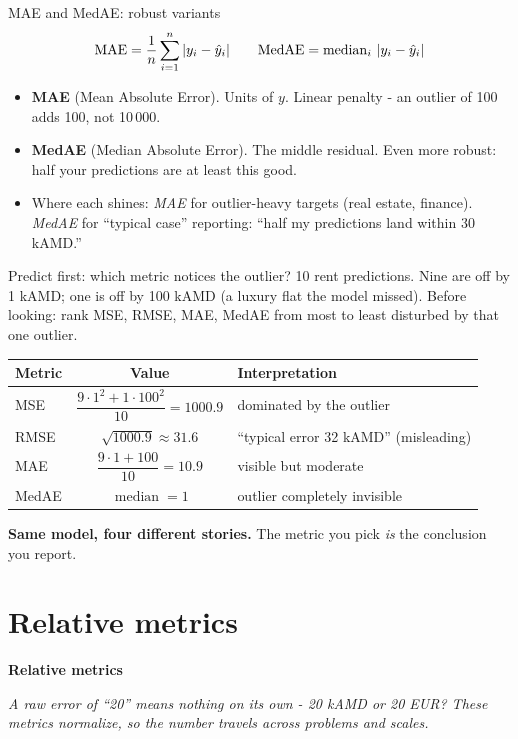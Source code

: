 \documentclass[aspectratio=169]{beamer}
\newcommand{\sectiontransition}[2]{%
  \begin{frame}[plain]
    \centering
    \vfill
    {\color{armblue}\Large\textbf{#1}}\\[14pt]
    \begin{minipage}{0.78\textwidth}\centering\itshape #2\end{minipage}
    \vfill
  \end{frame}%
}
\begin{document}
\begin{frame}{MAE and MedAE: robust variants}
  \[
    \text{MAE} = \frac{1}{n} \sum_{i=1}^n |y_i - \hat{y}_i|
    \qquad
    \text{MedAE} = \operatorname{median}_i\, |y_i - \hat{y}_i|
  \]
  \vfill
  \begin{itemize}
    \item \textbf{MAE} (Mean Absolute Error). Units of $y$. Linear penalty - an outlier of 100 adds 100, not 10\,000.
    \item \textbf{MedAE} (Median Absolute Error). The middle residual. Even more robust: half your predictions are at least this good.
    \item Where each shines: \emph{MAE} for outlier-heavy targets (real estate, finance). \emph{MedAE} for ``typical case'' reporting: ``half my predictions land within 30 kAMD.''
  \end{itemize}
\end{frame}

\begin{frame}{Predict first: which metric notices the outlier?}
  10 rent predictions. Nine are off by 1 kAMD; one is off by 100 kAMD (a luxury flat the model missed).
  \vfill
  Before looking: rank MSE, RMSE, MAE, MedAE from most to least disturbed by that one outlier.
  \pause
  \vfill
  \begin{center}\small
    \begin{tabular}{lcl}
      Metric & Value & Interpretation \\ \hline
      MSE   & $\dfrac{9 \cdot 1^2 + 1 \cdot 100^2}{10} = 1000.9$ & dominated by the outlier \\[4pt]
      RMSE  & $\sqrt{1000.9} \approx 31.6$ & ``typical error 32 kAMD'' (misleading) \\[2pt]
      MAE   & $\dfrac{9 \cdot 1 + 100}{10} = 10.9$ & visible but moderate \\[4pt]
      MedAE & $\operatorname{median} = 1$ & outlier completely invisible \\
    \end{tabular}
  \end{center}
  \vfill
  \footnotesize \textbf{Same model, four different stories.} The metric you pick \emph{is} the conclusion you report.
\end{frame}

\section{Relative metrics}
\sectiontransition{Relative metrics}{A raw error of ``20'' means nothing on its own - 20 kAMD or 20 EUR? These metrics normalize, so the number travels across problems and scales.}
\end{document}
